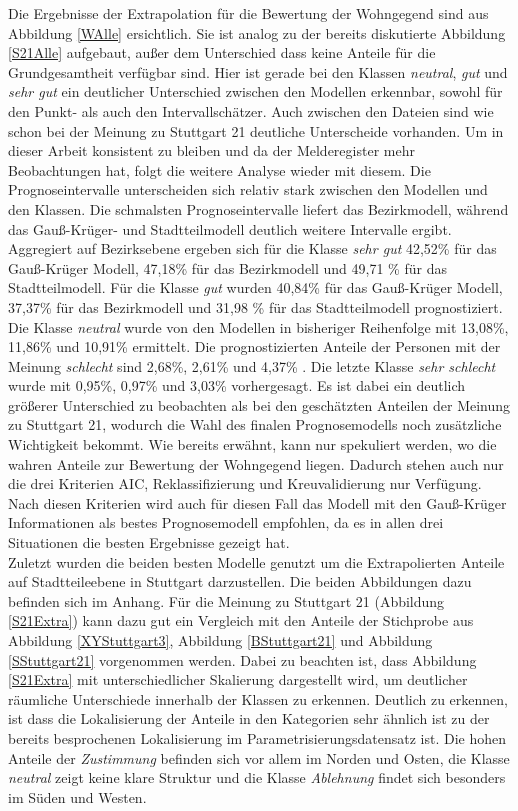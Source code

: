 \documentclass{Vorlage}
\begin{document}
Die Ergebnisse der Extrapolation für die Bewertung der Wohngegend sind aus Abbildung \ref{WAlle} ersichtlich. Sie ist analog zu der  bereits diskutierte Abbildung \ref{S21Alle} aufgebaut, außer dem Unterschied dass keine Anteile für die Grundgesamtheit verfügbar sind. Hier ist gerade bei den Klassen \textit{neutral}, \textit{gut} und \textit{sehr gut} ein deutlicher Unterschied zwischen den Modellen erkennbar, sowohl für den Punkt- als auch den Intervallschätzer. Auch zwischen den Dateien sind wie schon bei der Meinung zu Stuttgart 21 deutliche Unterscheide vorhanden. Um in dieser Arbeit konsistent zu bleiben und da der Melderegister mehr Beobachtungen hat, folgt die weitere Analyse wieder mit diesem. Die Prognoseintervalle unterscheiden sich relativ stark zwischen den Modellen und den Klassen. Die schmalsten Prognoseintervalle liefert das Bezirkmodell, während das Gauß-Krüger- und Stadtteilmodell deutlich weitere Intervalle ergibt. Aggregiert auf Bezirksebene ergeben sich für die Klasse \textit{sehr gut} 42,52\% für das Gauß-Krüger Modell, 47,18\% für das Bezirkmodell und 49,71 \% für das Stadtteilmodell.  Für die Klasse \textit{gut} wurden 40,84\% für das Gauß-Krüger Modell, 37,37\% für das Bezirkmodell und 31,98 \% für das Stadtteilmodell prognostiziert. Die Klasse \textit{neutral} wurde von den Modellen in bisheriger Reihenfolge mit 13,08\%, 11,86\% und 10,91\% ermittelt. Die prognostizierten Anteile der Personen mit der Meinung \textit{schlecht}  sind 2,68\%, 2,61\% und 4,37\% . Die letzte Klasse \textit{sehr schlecht} wurde mit 0,95\%, 0,97\% und 3,03\% vorhergesagt. Es ist dabei ein deutlich größerer Unterschied zu beobachten als bei den geschätzten Anteilen der Meinung zu Stuttgart 21, wodurch die Wahl des finalen Prognosemodells noch zusätzliche Wichtigkeit bekommt. Wie bereits erwähnt, kann nur spekuliert werden, wo die wahren Anteile zur Bewertung der Wohngegend liegen. Dadurch stehen auch nur die drei Kriterien AIC, Reklassifizierung und Kreuvalidierung nur Verfügung. Nach diesen Kriterien wird auch für diesen Fall das Modell mit den Gauß-Krüger Informationen als bestes Prognosemodell empfohlen, da es in allen drei Situationen die besten Ergebnisse gezeigt hat.\\
Zuletzt wurden die beiden besten Modelle genutzt um die Extrapolierten Anteile auf Stadtteileebene in Stuttgart darzustellen. Die beiden Abbildungen dazu befinden sich im Anhang. Für die Meinung zu Stuttgart 21 (Abbildung \ref{S21Extra}) kann dazu gut ein Vergleich mit den Anteile der Stichprobe aus Abbildung \ref{XYStuttgart3}, Abbildung \ref{BStuttgart21} und Abbildung \ref{SStuttgart21} vorgenommen werden. Dabei zu beachten ist, dass Abbildung \ref{S21Extra} mit unterschiedlicher Skalierung dargestellt wird, um deutlicher räumliche Unterschiede innerhalb der Klassen zu erkennen. Deutlich zu erkennen, ist dass die Lokalisierung der Anteile in den Kategorien sehr ähnlich ist zu der bereits besprochenen Lokalisierung im Parametrisierungsdatensatz ist. Die hohen Anteile der \textit{Zustimmung} befinden sich vor allem im Norden und Osten, die Klasse \textit{neutral} zeigt keine klare Struktur und die Klasse \textit{Ablehnung} findet sich besonders im Süden und Westen.\\
\end{document}
